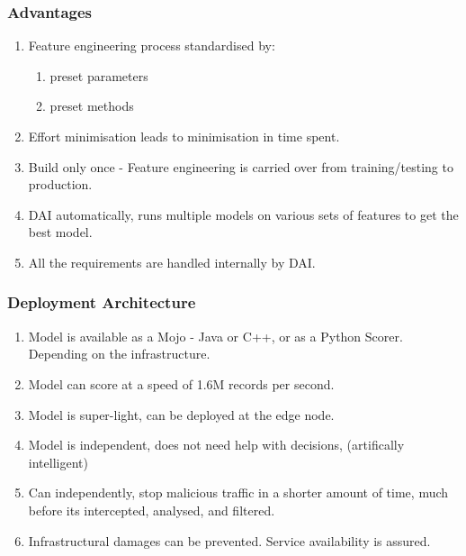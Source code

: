 \documentclass[11pt,
               aspectratio=169,
               hyperref={colorlinks}
               ]{beamer}
\begin{document}
	\begin{frame}
		\frametitle{Advantages}
		\begin{enumerate}
			\item Feature engineering process standardised by:
				\begin{enumerate}
					\item preset parameters
					\item preset methods
				\end{enumerate}
			\item Effort minimisation leads to minimisation in time spent.
			\item Build only once - Feature engineering is carried over from training/testing to production.
			\item DAI automatically, runs multiple models on various sets of features to get the best model. 
			\item All the requirements are handled internally by DAI. 
		\end{enumerate}
\end{frame}
	\begin{frame}[fragile]
            \frametitle{Deployment Architecture}
		\begin{enumerate}
                \item Model is available as a Mojo - Java or C++, or as a Python Scorer. Depending on the infrastructure. 
                \item Model can score at a speed of 1.6M records per second. 
                \item Model is super-light, can be deployed at the edge node. 
                \item Model is independent, does not need help with decisions, (artifically intelligent)
                \item Can independently, stop malicious traffic in a shorter amount of time, much before its intercepted, analysed, and filtered. 
                \item Infrastructural damages can be prevented. Service availability is assured. 
		\end{enumerate}
			
\end{frame}
\end{document}
